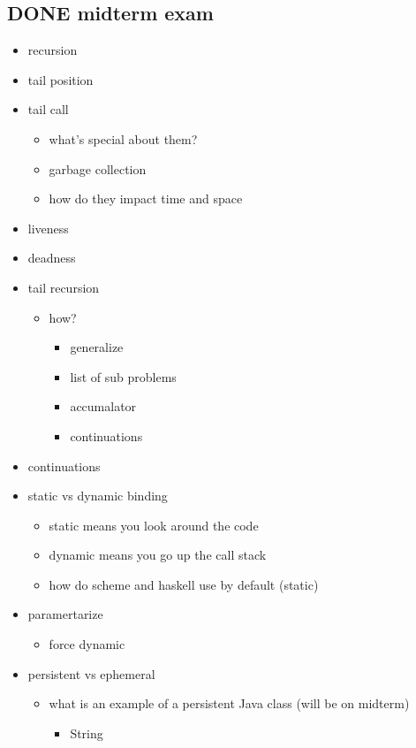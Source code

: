 \documentclass[11pt]{article}
\begin{document}
\subsection{{\bfseries\sffamily DONE} midterm exam}
\label{sec-15-1}
\begin{itemize}
\item recursion
\item tail position
\item tail call
\begin{itemize}
\item what's special about them?
\item garbage collection
\item how do they impact time and space
\end{itemize}
\item liveness
\item deadness
\item tail recursion
\begin{itemize}
\item how?
\begin{itemize}
\item generalize
\item list of sub problems
\item accumalator
\item continuations
\end{itemize}
\end{itemize}
\item continuations
\item static vs dynamic binding
\begin{itemize}
\item static means you look around the code
\item dynamic means you go up the call stack
\item how do scheme and haskell use by default (static)
\end{itemize}
\item paramertarize
\begin{itemize}
\item force dynamic
\end{itemize}
\item persistent vs ephemeral
\begin{itemize}
\item what is an example of a persistent Java class (will be on midterm)
\begin{itemize}
\item String
\end{itemize}

\end{itemize}
\end{itemize}
\end{document}
